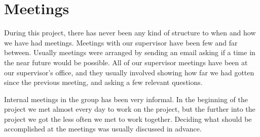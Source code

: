 \chapter{Meetings}
During this project, there has never been any kind of structure to when and how we have had meetings. Meetings with our supervisor have been few and far between. Usually meetings were arranged by sending an email asking if a time in the near future would be possible. All of our supervisor meetings have been at our supervisor's office, and they usually involved showing how far we had gotten since the previous meeting, and asking a few relevant questions. 

Internal meetings in the group has been very informal. In the beginning of the project we met almost every day to work on the project, but the further into the project we got the less often we met to work together. Deciding what should be accomplished at the meetings was usually discussed in advance.